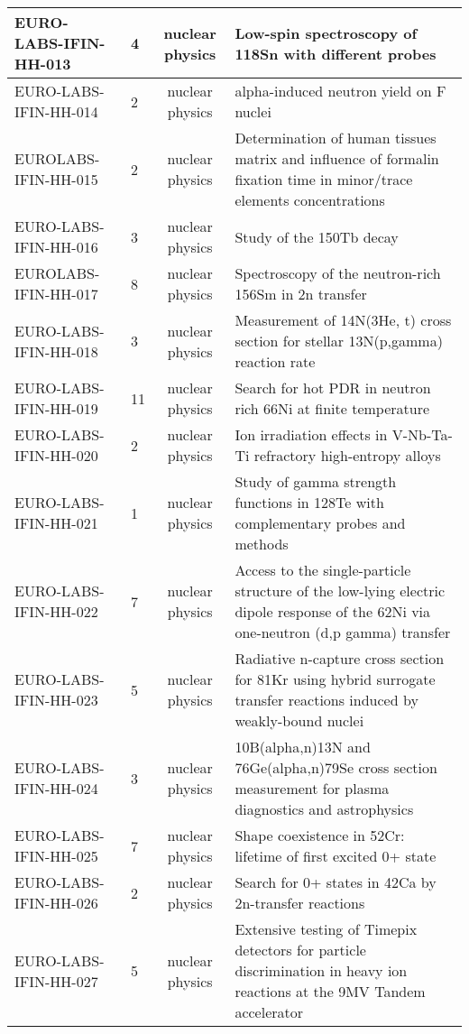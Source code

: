 \begin{xltabular}{\textwidth}{|l|p{0.12\textwidth}|c|Y|}
EURO-LABS-IFIN-HH-013	& 4 &	nuclear physics &	Low-spin spectroscopy of 118Sn with different probes \\ \hline
EURO-LABS-IFIN-HH-014	& 2 &	nuclear physics &	alpha-induced neutron yield on F nuclei \\ \hline
EUROLABS-IFIN-HH-015 	& 2  &	nuclear physics &	Determination of human tissues matrix and influence of formalin fixation time in minor/trace elements concentrations \\ \hline
EURO-LABS-IFIN-HH-016	& 3 &	nuclear physics &	Study of the 150Tb decay \\ \hline
EUROLABS- IFIN-HH-017	& 8 &	nuclear physics &	Spectroscopy of the neutron-rich 156Sm in 2n transfer \\ \hline
EURO-LABS-IFIN-HH-018	& 3 &	nuclear physics &	Measurement of 14N(3He, t) cross section for stellar 13N(p,gamma) reaction rate \\ \hline
EURO-LABS-IFIN-HH-019	& 11 &	nuclear physics &	Search for hot PDR in neutron rich 66Ni at finite temperature \\ \hline
EURO-LABS-IFIN-HH-020	& 2 &	nuclear physics &	Ion irradiation effects in V-Nb-Ta-Ti refractory high-entropy alloys \\ \hline
EURO-LABS-IFIN-HH-021	& 1 &	nuclear physics	& Study of gamma strength functions in 128Te with complementary probes and methods \\ \hline
EURO-LABS-IFIN-HH-022	& 7 &	nuclear physics &	Access to the single-particle structure of the low-lying electric dipole response of the 62Ni via one-neutron (d,p gamma) transfer \\ \hline
EURO-LABS-IFIN-HH-023	& 5 &	nuclear physics &	Radiative n-capture cross section for 81Kr using hybrid surrogate transfer reactions induced by weakly-bound nuclei \\ \hline
EURO-LABS-IFIN-HH-024	& 3 &	nuclear physics &	10B(alpha,n)13N and 76Ge(alpha,n)79Se cross section measurement for plasma diagnostics and astrophysics \\ \hline
EURO-LABS-IFIN-HH-025	& 7 &	nuclear physics &	Shape coexistence in 52Cr: lifetime of first excited 0+ state \\ \hline
EURO-LABS-IFIN-HH-026	& 2 &	nuclear physics &	Search for 0+ states in 42Ca by 2n-transfer reactions \\ \hline
EURO-LABS-IFIN-HH-027	& 5 &	nuclear physics &	Extensive testing of Timepix detectors for particle discrimination in heavy ion reactions at the 9MV Tandem accelerator \\ \hline

\end{xltabular}
